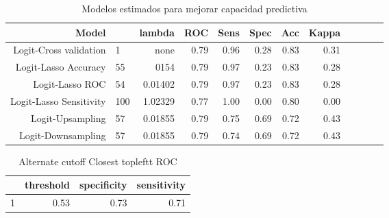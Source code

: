 \documentclass[11pt]{article}
\begin{document}
\begin{table}[ht]
\caption{Modelos estimados para mejorar capacidad predictiva} 
  \label{}
\centering
\begin{tabular}{rlrrrrrrrrrr}
  \hline
Model &  & lambda & ROC & Sens & Spec & Acc & Kappa \\ 
  \hline
Logit-Cross validation & 1 & none & 0.79 & 0.96 & 0.28 & 0.83 & 0.31  \\ 
Logit-Lasso Accuracy &  55 & 0154 & 0.79 & 0.97 & 0.23 & 0.83 & 0.28  \\ 
Logit-Lasso ROC & 54 & 0.01402 & 0.79 & 0.97 & 0.23 & 0.83 & 0.28  \\ 
Logit-Lasso Sensitivity & 100 & 1.02329 & 0.77 & 1.00 & 0.00 & 0.80 & 0.00 \\ 
Logit-Upsampling &  57 & 0.01855 & 0.79 & 0.75 & 0.69 & 0.72 & 0.43  \\ 
Logit-Downsampling &  57 & 0.01855 & 0.79 & 0.74 & 0.69 & 0.72 & 0.43 \\ 
   \hline
\end{tabular}
\end{table}

\begin{table}[ht]
\centering
\caption{Alternate cutoff Closest topleftt ROC}
\begin{tabular}{rrrr}
  \hline
 & threshold & specificity & sensitivity \\ 
  \hline
1 & 0.53 & 0.73 & 0.71 \\ 
   \hline
\end{tabular}
\end{table}
\end{document}
